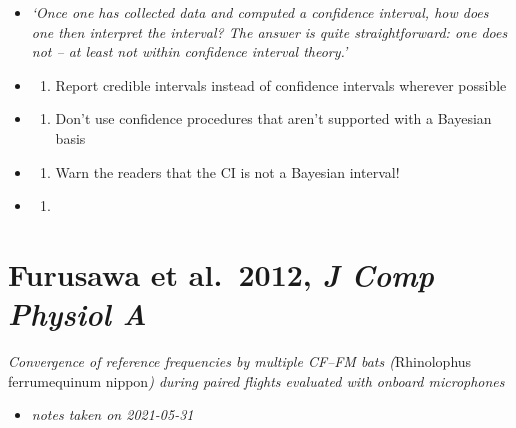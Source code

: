 \documentclass[
]{book}
\providecommand{\tightlist}{%
  \setlength{\itemsep}{0pt}\setlength{\parskip}{0pt}}
\begin{document}
\begin{itemize}
\item
  \emph{`Once one has collected data and computed a confidence
  interval, how does one then interpret the interval? The
  answer is quite straightforward: one does not -- at least not within confidence interval theory.'}
\item
  \begin{enumerate}
  \def\labelenumi{\arabic{enumi}.}
  \tightlist
  \item
    Report credible intervals instead of confidence intervals wherever possible
  \end{enumerate}
\item
  \begin{enumerate}
  \def\labelenumi{\arabic{enumi}.}
  \setcounter{enumi}{1}
  \tightlist
  \item
    Don't use confidence procedures that aren't supported with a Bayesian basis
  \end{enumerate}
\item
  \begin{enumerate}
  \def\labelenumi{\arabic{enumi}.}
  \setcounter{enumi}{2}
  \tightlist
  \item
    Warn the readers that the CI is not a Bayesian interval!
  \end{enumerate}
\item
  \begin{enumerate}
  \def\labelenumi{\arabic{enumi}.}
  \setcounter{enumi}{3}
  \tightlist
  \item
  \end{enumerate}
\end{itemize}

\hypertarget{furusawa-et-al.-2012-j-comp-physiol-a}{%
\chapter{\texorpdfstring{Furusawa et al.~2012, \emph{J Comp Physiol A}}{Furusawa et al.~2012, J Comp Physiol A}}\label{furusawa-et-al.-2012-j-comp-physiol-a}}


\emph{Convergence of reference frequencies by multiple CF--FM bats (}Rhinolophus ferrumequinum nippon\emph{) during paired flights evaluated with onboard microphones} \citep{furusawa2012convergence}

\begin{itemize}
\tightlist
\item
  \emph{notes taken on 2021-05-31}
\end{itemize}
\end{document}
